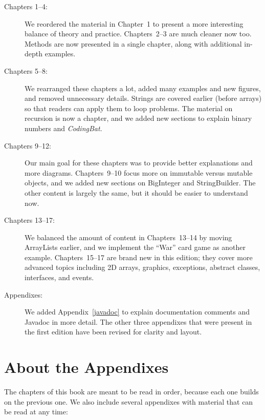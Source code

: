 \begin{description}

\item[Chapters 1--4:]
We reordered the material in Chapter~1 to present a more interesting balance of theory and practice.
Chapters~2--3 are much cleaner now too.
Methods are now presented in a single chapter, along with additional in-depth examples.

\item[Chapters 5--8:]
We rearranged these chapters a lot, added many examples and new figures, and removed unnecessary details.
Strings are covered earlier (before arrays) so that readers can apply them to loop problems.
The material on recursion is now a chapter, and we added new sections to explain binary numbers and {\it CodingBat}.

\item[Chapters 9--12:]
Our main goal for these chapters was to provide better explanations and more diagrams.
Chapters~9--10 focus more on immutable versus mutable objects, and we added new sections on BigInteger and StringBuilder.
The other content is largely the same, but it should be easier to understand now.

\item[Chapters 13--17:]
We balanced the amount of content in Chapters~13--14 by moving ArrayLists earlier, and we implement the ``War'' card game as another example.
Chapters~15--17 are brand new in this edition; they cover more advanced topics including 2D arrays, graphics, exceptions, abstract classes, interfaces, and events.

\item[Appendixes:]
We added Appendix~\ref{javadoc} to explain documentation comments and Javadoc in more detail. %
The other three appendixes that were present in the first edition have been revised for clarity and layout.

\end{description}


\section*{About the Appendixes}

The chapters of this book are meant to be read in order, because each one builds on the previous one.
We also include several appendixes with material that can be read at any time:

